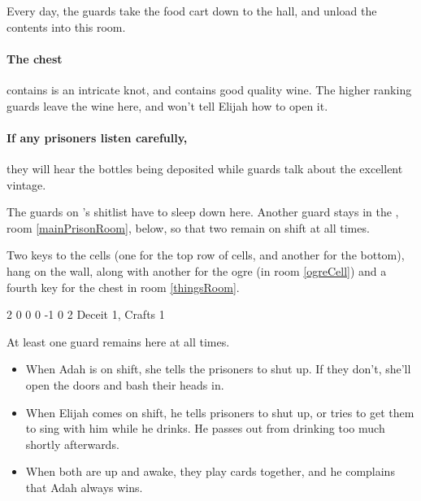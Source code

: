\begin{multicols}{2}

Every day, the guards take the food cart down to the hall, and unload the contents into this room.

\paragraph{The chest}
contains is an intricate knot, and contains good quality wine.
The higher ranking guards leave the wine here, and won't tell Elijah how to open it.

\paragraph{If any prisoners listen carefully,}
they will hear the bottles being deposited while guards talk about the excellent vintage.


The guards on 's shitlist have to sleep down here.
Another guard stays in the , room \ref{mainPrisonRoom}, below, so that two remain on shift at all times.

Two keys to the cells (one for the top row of cells, and another for the bottom), hang on the wall, along with another for the ogre (in room \ref{ogreCell}) and a fourth key for the chest in room \ref{thingsRoom}.

{2}%
{0}%
{{0}%
{0}%
{-1}}%
{0}%
{2}%
{
  Deceit 1, Crafts 1
  \knacks{\brawler, \berserker}
}%
{\shortsword}%
{}



At least one guard remains here at all times.
\begin{itemize}

  \item
  When Adah is on shift, she tells the prisoners to shut up.
  If they don't, she'll open the doors and bash their heads in.
  \item
  When Elijah comes on shift, he tells prisoners to shut up, or tries to get them to sing with him while he drinks.
  He passes out from drinking too much shortly afterwards.
  \item
  When both are up and awake, they play cards together, and he complains that Adah always wins.


\end{itemize}
\end{multicols}
